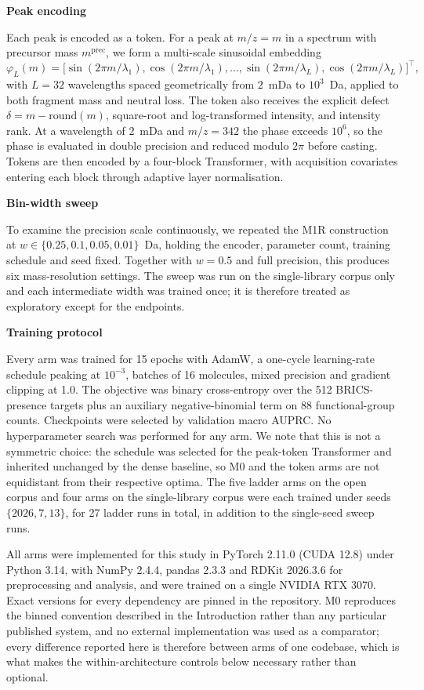 \documentclass[11pt]{article}
\newcommand{\hd}[1]{\medskip\par\noindent\textbf{#1}\par\nobreak\vspace{2pt}\noindent\ignorespaces}
\newcommand{\mz}{\ensuremath{m/z}}
\begin{document}
\hd{Peak encoding}
Each peak is encoded as a token. For a peak at $\mz=m$ in a spectrum with precursor mass $m^{\mathrm{prec}}$, we form a multi-scale sinusoidal embedding
\begin{equation}
\varphi_L(m)=\bigl[\sin(2\pi m/\lambda_1),\cos(2\pi m/\lambda_1),\ldots,\sin(2\pi m/\lambda_L),\cos(2\pi m/\lambda_L)\bigr]^\top,
\end{equation}
with $L=32$ wavelengths spaced geometrically from $2$~mDa to $10^3$~Da, applied to both fragment mass and neutral loss. The token also receives the explicit defect $\delta=m-\mathrm{round}(m)$, square-root and log-transformed intensity, and intensity rank. At a wavelength of $2$~mDa and $\mz=342$ the phase exceeds $10^6$, so the phase is evaluated in double precision and reduced modulo $2\pi$ before casting. Tokens are then encoded by a four-block Transformer, with acquisition covariates entering each block through adaptive layer normalisation.

\hd{Bin-width sweep}
To examine the precision scale continuously, we repeated the M1R construction at $w\in\{0.25,0.1,0.05,0.01\}$~Da, holding the encoder, parameter count, training schedule and seed fixed. Together with $w=0.5$ and full precision, this produces six mass-resolution settings. The sweep was run on the single-library corpus only and each intermediate width was trained once; it is therefore treated as exploratory except for the endpoints.

\hd{Training protocol}
Every arm was trained for 15 epochs with AdamW, a one-cycle learning-rate schedule peaking at $10^{-3}$, batches of 16 molecules, mixed precision and gradient clipping at 1.0. The objective was binary cross-entropy over the 512 BRICS-presence targets plus an auxiliary negative-binomial term on 88 functional-group counts. Checkpoints were selected by validation macro AUPRC. No hyperparameter search was performed for any arm. We note that this is not a symmetric choice: the schedule was selected for the peak-token Transformer and inherited unchanged by the dense baseline, so M0 and the token arms are not equidistant from their respective optima. The five ladder arms on the open corpus and four arms on the single-library corpus were each trained under seeds $\{2026,7,13\}$, for 27 ladder runs in total, in addition to the single-seed sweep runs.

All arms were implemented for this study in PyTorch 2.11.0 (CUDA 12.8) under
Python 3.14, with NumPy 2.4.4, pandas 2.3.3 and RDKit 2026.3.6 for preprocessing
and analysis, and were trained on a single NVIDIA RTX 3070. Exact versions for
every dependency are pinned in the repository. M0 reproduces the binned
convention described in the Introduction rather than any particular published
system, and no external implementation was used as a comparator; every difference
reported here is therefore between arms of one codebase, which is what makes the
within-architecture controls below necessary rather than optional.
\end{document}
